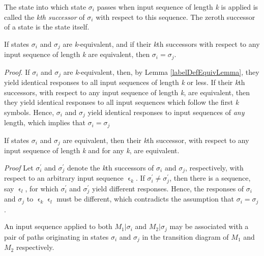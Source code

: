 \documentclass[a4paper]{report}
\begin{document}
    The state into which state $ \sigma_i $ passes when input sequence of length \emph{k} is applied is called the \emph{kth successor} of $ \sigma_i $ with respect to this sequence. The zeroth successor of a state is the state itself.

    \theorem If states $ \sigma_i $ and $ \sigma_j $ are \emph{k}-equivalent, and if their \emph{k}th successors with respect to any input sequence of length \emph{k} are equivalent, then $\sigma_i = \sigma_j$.

    \emph{Proof}. If $\sigma_i$ and $\sigma_j$ are \emph{k}-equivalent, then, by Lemma \ref{labelDefEquivLemma}, they yield identical responses to all input sequences of length \emph{k} or less. If their \emph{k}th successors, with respect to any input sequence of length \emph{k}, are equivalent, then they yield identical responses to all input sequences which follow the first \emph{k} symbols. Hence, $ \sigma_i $ and $ \sigma_j $ yield identical responses to input sequences of \emph{any} length, which implies that $\sigma_i = \sigma_j$

    \theorem If states $ \sigma_i $ and $ \sigma_j $ are equivalent, then their \emph{k}th successor, with respect to any input sequence of length \emph{k} and for any \emph{k}, are equivalent.

    \emph{Proof} Let $ \sigma^{'}_i$ and  $ \sigma^{'}_j$ denote the \emph{k}th successors of $\sigma_i$ and $\sigma_j$, respectively, with respect to an arbitrary input sequence $\upvarepsilon_k$. If $ \sigma^{'}_i \neq \sigma^{'}_j $, then there is a sequence, say $\upvarepsilon_l$, for which $ \sigma^{'}_i $ and $ \sigma^{'}_j $ yield different responses. Hence, the responses of $\sigma_i$ and $\sigma_j$ to $\upvarepsilon_k\upvarepsilon_l$ must be different, which contradicts the assumption that $ \sigma_i = \sigma_j $.

    An input sequence applied to both $M_1|\sigma_i$ and $M_2|\sigma_j$ may be associated with a pair of paths originating in states $\sigma_i$ and $\sigma_j$ in the transition diagram of $M_1$ and $M_2$ respectively.
\end{document}
